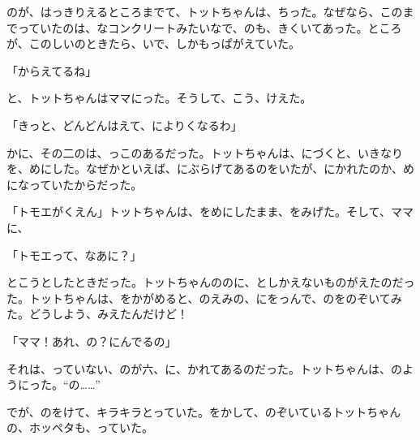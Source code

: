 のが、はっきりえるところまでて、トットちゃんは、ちった。なぜなら、このまでっていたのは、なコンクリートみたいなで、のも、きくいてあった。ところが、このしいのときたら、いで、しかもっぱがえていた。

「からえてるね」

と、トットちゃんはママにった。そうして、こう、けえた。

「きっと、どんどんはえて、によりくなるわ」

かに、その二のは、っこのあるだった。トットちゃんは、にづくと、いきなりを、めにした。なぜかといえば、にぶらげてあるのをいたが、にかれたのか、めになっていたからだった。

「トモエがくえん」トットちゃんは、をめにしたまま、をみげた。そして、ママに、

「トモエって、なあに？」

とこうとしたときだった。トットちゃんののに、としかえないものがえたのだった。トットちゃんは、をかがめると、のえみの、にをっんで、のをのぞいてみた。どうしよう、みえたんだけど！

「ママ！あれ、の？にんでるの」

それは、っていない、のが六、に、かれてあるのだった。トットちゃんは、のようにった。“の……”

でが、のをけて、キラキラとっていた。をかして、のぞいているトットちゃんの、ホッペタも、っていた。


